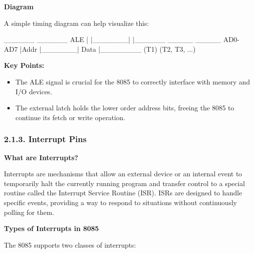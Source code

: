 \documentclass[
]{article}
\newenvironment{Shaded}{}{}
\newcommand{\NormalTok}[1]{#1}
\begin{document}
\textbf{Diagram}

A simple timing diagram can help visualize this:

\begin{Shaded}
\begin{Highlighting}[]
\NormalTok{          \_\_\_\_\_\_         \_\_\_\_\_\_}
\NormalTok{ALE      |      |\_\_\_\_\_\_\_|      |\_\_\_\_\_\_}
\NormalTok{          \_\_\_\_\_           \_\_\_\_\_}
\NormalTok{AD0{-}AD7  |Addr |\_\_\_\_\_\_\_| Data |\_\_\_\_\_\_\_\_}
\NormalTok{         (T1)      (T2, T3, ...)}
\end{Highlighting}
\end{Shaded}

\textbf{Key Points:}

\begin{itemize}
\item
  The ALE signal is crucial for the 8085 to correctly interface with
  memory and I/O devices.
\item
  The external latch holds the lower order address bits, freeing the
  8085 to continue its fetch or write operation.
\end{itemize}

\hypertarget{213-interrupt-pins}{%
\subsubsection{2.1.3. Interrupt Pins}\label{213-interrupt-pins}}

\textbf{What are Interrupts?}

Interrupts are mechanisms that allow an external device or an internal
event to temporarily halt the currently running program and transfer
control to a special routine called the Interrupt Service Routine (ISR).
ISRs are designed to handle specific events, providing a way to respond
to situations without continuously polling for them.

\textbf{Types of Interrupts in 8085}

The 8085 supports two classes of interrupts:
\end{document}
